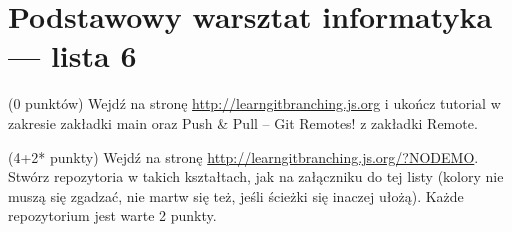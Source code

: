 

\pagestyle{plain}



\section*{Podstawowy warsztat informatyka --- lista 6}
\begin{zadanie} (0 punktów) 
Wejdź na stronę \url{http://learngitbranching.js.org} i ukończ tutorial w zakresie zakładki main oraz Push \& Pull -- Git Remotes! z zakładki Remote.
\end{zadanie}

\begin{zadanie} (4+2* punkty) 
Wejdź na stronę \url{http://learngitbranching.js.org/?NODEMO}. Stwórz repozytoria w takich kształtach, jak na załączniku do tej listy (kolory nie muszą się zgadzać, nie martw się też, jeśli ścieżki się inaczej ułożą). Każde repozytorium jest warte 2 punkty.
\end{zadanie}

